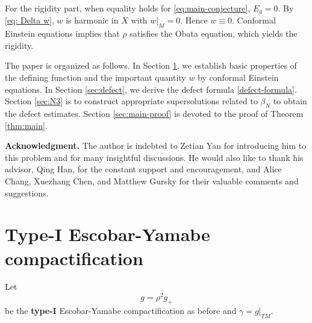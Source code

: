 \documentclass[11pt,letterpaper]{amsart}
\theoremstyle{definition}
\theoremstyle{remark}
\numberwithin{equation}{section}
\begin{document}
For the rigidity part, when equality holds for \eqref{eq:main-conjecture}, $E_g=0$. By \eqref{eq: Delta w}, $w$ is  harmonic  in $X$ with $w|_M=0$. Hence $w\equiv0$.  Conformal Einstein equations  implies that $\rho$ satisfies the Obata equation, which yields the rigidity.

The paper is organized as follows.  In Section \ref{sec:prelim}, we establish basic properties of the defining function and the important quantity $w$ by conformal Einstein equations.  In Section \ref{sec:defect}, we derive the defect formula \eqref{defect-formula}.  Section \ref{sec:N3} is to construct appropriate supersolutions related to $\beta_N$ to obtain the defect estimates. Section \ref{sec:main-proof} is devoted to the proof of Theorem \ref{thm:main}.

\medskip
\noindent \textbf{Acknowledgment.}
The author is indebted to Zetian Yan for introducing him to this problem and for many insightful discussions. He would also like to thank his advisor, Qing Han, for the constant support and encouragement, and Alice Chang, Xuezhang Chen, and Matthew Gursky for their valuable comments and suggestions.

\section{Type-I Escobar-Yamabe compactification}\label{sec:prelim}
Let 
\[
  g=\rho^2g_+
\]
be the \textbf{type-I} Escobar-Yamabe compactification as before and $\gamma=g|_{TM}$. 
\end{document}
